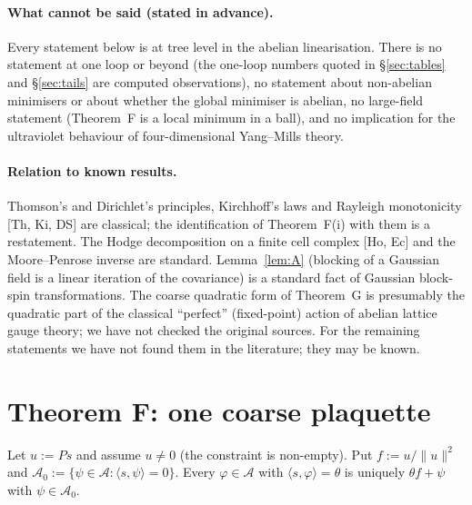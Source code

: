 \documentclass[11pt,a4paper]{article}
\theoremstyle{definition}
\theoremstyle{remark}
\newcommand{\cA}{\mathcal{A}}
\begin{document}
\paragraph{What cannot be said (stated in advance).}
Every statement below is at tree level in the abelian linearisation.
There is no statement at one loop or beyond (the one-loop numbers quoted in \S\ref{sec:tables} and \S\ref{sec:tails} are computed observations), no statement about non-abelian minimisers or about whether the global minimiser is abelian, no large-field statement (Theorem~F is a local minimum in a ball), and no implication for the ultraviolet behaviour of four-dimensional Yang--Mills theory.

\paragraph{Relation to known results.}
Thomson's and Dirichlet's principles, Kirchhoff's laws and Rayleigh monotonicity [Th, Ki, DS] are classical; the identification of Theorem~F(i) with them is a restatement.
The Hodge decomposition on a finite cell complex [Ho, Ec] and the Moore--Penrose inverse are standard.
Lemma~\ref{lem:A} (blocking of a Gaussian field is a linear iteration of the covariance) is a standard fact of Gaussian block-spin transformations.
The coarse quadratic form of Theorem~G is presumably the quadratic part of the classical ``perfect'' (fixed-point) action of abelian lattice gauge theory; we have not checked the original sources.
For the remaining statements we have not found them in the literature; they may be known.

\section{Theorem F: one coarse plaquette}\label{sec:F}

Let $u:=Ps$ and assume $u\ne0$ (the constraint is non-empty). Put $f:=u/\|u\|^2$ and $\cA_0:=\{\psi\in\cA:\langle s,\psi\rangle=0\}$.
Every $\varphi\in\cA$ with $\langle s,\varphi\rangle=\theta$ is uniquely $\theta f+\psi$ with $\psi\in\cA_0$.
\end{document}
